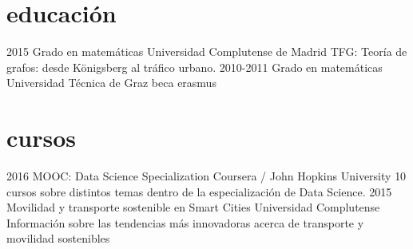 \documentclass[]{friggeri-cv}
\begin{document}
\section{educación}

\begin{entrylist}
  \entry
    {2015}
    {Grado en matemáticas}
    {Universidad Complutense de Madrid}
    {TFG: Teoría de grafos: desde Königsberg al tráfico urbano.}
  \entry
    {2010-2011}
    {Grado en matemáticas}
    {Universidad Técnica de Graz}
    {beca erasmus}
\end{entrylist}

\section{cursos}

\begin{entrylist}
  \entry
      {2016}
      {MOOC: Data Science Specialization}
      {Coursera / John Hopkins University}
      {10 cursos sobre distintos temas dentro de la especialización de Data Science.}
  \entry
    {2015}
    {Movilidad y transporte sostenible en Smart Cities}
    {Universidad Complutense}
    {Información sobre las tendencias más innovadoras acerca de transporte y movilidad sostenibles}
\end{entrylist}





\fi
\end{document}
